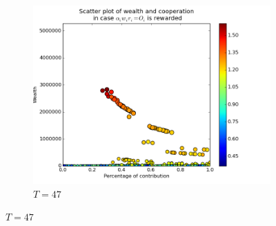\documentclass{article}
\begin{document}
\begin{figure}[h]
\begin{subfigure}[t]{0.333\textwidth}
\includegraphics[width=\textwidth]{nq_output_scatter/scatter_ranking_1_047.png}
\caption{$T = 47$}
\end{subfigure}%

\bigskip


\end{figure}
\end{document}
